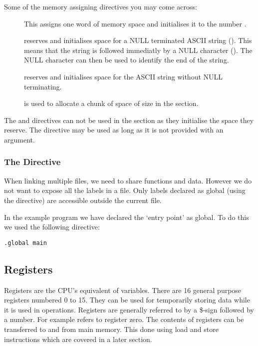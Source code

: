 Some of the memory assigning directives you may come across:
\begin{description}

\item[\word {}]  This assigns one word of memory space and 
initialises it to the number .

\item[\asciiz {}] reserves and initialises space 
for a NULL terminated ASCII string ().
This means that the string is followed immediatly by a NULL
character ().  The NULL character can then be used
to identify the end of the string.

\item[\ascii {}] reserves and initialises space for 
the ASCII string  without NULL terminating.

\item[\Space {}] is used to allocate a chunk of space 
of size  in the \bss section.

\end{description}
The \ascii and \asciiz directives can not be used in the \bss section
as they initialise the space they reserve.  The \word directive may be
used as long as it is not provided with an argument.

\subsubsection{The \Global Directive}
When linking multiple files, we need to share functions and data.
However we do not want to expose all the labels in a file.
Only labels declared as global (using the \Global directive) are
accessible outside the current file.  

In the example program we have declared the `entry point'  as 
global. To do this we used the following directive:
\begin{verbatim}
.global main
\end{verbatim}


\subsection{Registers}
Registers are the CPU's equivalent of variables.  There are 16 general
purpose registers numbered 0 to 15. They can be used for temporarily
storing data while it is used in operations.  Registers are generally
referred to by a \$-sign followed by a number.  For example 
refers to register zero. The contents of registers can be transferred
to and from main memory. This done using load and store instructions
which are covered in a later section.


